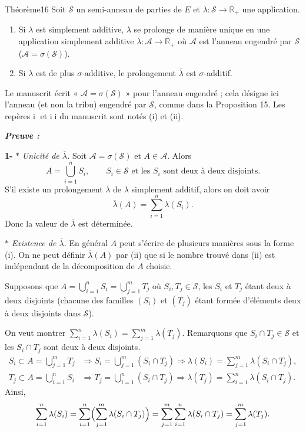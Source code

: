 \documentclass[11pt,a4paper]{article}
\newcommand{\Rb}{\overline{\mathbb{R}}}
\newcommand{\A}{\mathscr{A}}
\newcommand{\Ss}{\mathscr{S}}
\newenvironment{preuve}{\par\textit{\textbf{Preuve :}}\par\nopagebreak[4]}{\par}
\begin{document}
\begin{enonce}{Théorème}{16}
Soit $\Ss$ un semi-anneau de parties de $E$ et $\lambda:\Ss\to\Rb_+$ une application.
\begin{enumerate}[label=\textbf{\arabic*-},leftmargin=1.2cm]
  \item Si $\lambda$ est simplement additive, $\lambda$ se prolonge de manière unique en une application simplement additive
        $\overline\lambda:\A\to\Rb_+$ où $\A$ est l'anneau engendré par $\Ss$ ($\A=\sigma(\Ss)$).
  \item Si $\lambda$ est de plus $\sigma$-additive, le prolongement $\overline\lambda$ est $\sigma$-additif.
\end{enumerate}
\end{enonce}

\begin{note}
Le manuscrit écrit « $\A=\sigma(\Ss)$ » pour l'anneau engendré ; cela désigne ici l'anneau (et non la tribu) engendré par $\Ss$, comme dans la Proposition 15.
Les repères \textcircled{\scriptsize i} et \textcircled{\scriptsize ii} du manuscrit sont notés (i) et (ii).
\end{note}

\begin{preuve}\end{preuve}
\textbf{1-} $\ast$ \emph{Unicité de $\overline\lambda$.} Soit $\A=\sigma(\Ss)$ et $A\in\A$. Alors
\[
  A=\bigcup_{i=1}^{n}S_i,\qquad S_i\in\Ss\text{ et les }S_i\text{ sont deux à deux disjoints.}\tag{i}
\]
S'il existe un prolongement $\overline\lambda$ de $\lambda$ simplement additif, alors on doit avoir
\[
  \overline\lambda(A)=\sum_{i=1}^{n}\lambda(S_i).\tag{ii}
\]
Donc la valeur de $\overline\lambda$ est déterminée.

$\ast$ \emph{Existence de $\overline\lambda$.} En général $A$ peut s'écrire de plusieurs manières sous la forme (i). On ne peut définir $\overline\lambda(A)$ par (ii)
que si le nombre trouvé dans (ii) est indépendant de la décomposition de $A$ choisie.

Supposons que $A=\bigcup_{i=1}^{n}S_i=\bigcup_{j=1}^{m}T_j$ où $S_i,T_j\in\Ss$, les $S_i$ et $T_j$ étant deux à deux disjoints (chacune des familles $(S_i)$ et $(T_j)$ étant formée d'éléments deux à deux disjoints dans $\Ss$).

On veut montrer $\displaystyle\sum_{i=1}^{n}\lambda(S_i)=\sum_{j=1}^{m}\lambda(T_j)$.
Remarquons que $S_i\cap T_j\in\Ss$ et les $S_i\cap T_j$ sont deux à deux disjoints.
\begin{align*}
  S_i\subset A=\bigcup_{j=1}^{m}T_j&\Rightarrow S_i=\bigcup_{j=1}^{m}(S_i\cap T_j)\Rightarrow\lambda(S_i)=\sum_{j=1}^{m}\lambda(S_i\cap T_j),\\
  T_j\subset A=\bigcup_{i=1}^{n}S_i&\Rightarrow T_j=\bigcup_{i=1}^{n}(S_i\cap T_j)\Rightarrow\lambda(T_j)=\sum_{i=1}^{n}\lambda(S_i\cap T_j).
\end{align*}
Ainsi,
\[
  \sum_{i=1}^{n}\lambda(S_i)=\sum_{i=1}^{n}\Bigl(\sum_{j=1}^{m}\lambda(S_i\cap T_j)\Bigr)=\sum_{j=1}^{m}\sum_{i=1}^{n}\lambda(S_i\cap T_j)=\sum_{j=1}^{m}\lambda(T_j).
\]
\end{document}
